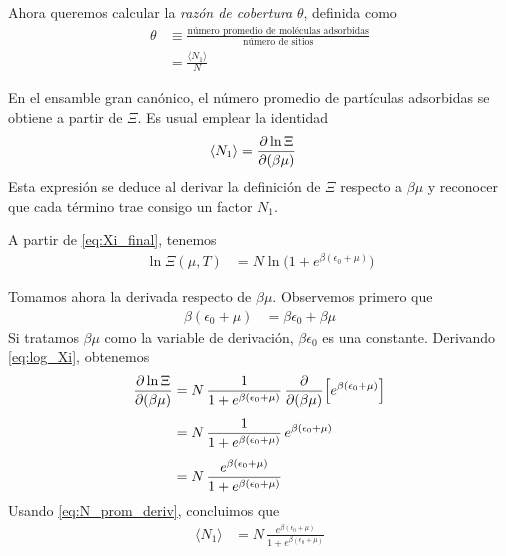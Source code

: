 \documentclass{article}
\begin{document}

Ahora queremos calcular la \emph{razón de cobertura} \(\theta\), definida como
\begin{equation}
\begin{split}
\theta
&\equiv \frac{\text{número promedio de moléculas adsorbidas}}{\text{número de sitios}} \\[4pt]
&= \frac{\langle N_{1} \rangle}{N}
\end{split}\label{eq:def_theta}
\end{equation}

En el ensamble gran canónico, el número promedio de partículas adsorbidas se obtiene a partir de \(\Xi\). Es usual emplear la identidad
\begin{equation}
\begin{split}
\langle N_{1} \rangle
&= \pdv{\ln \Xi}{(\beta\mu)}
\end{split}\label{eq:N_prom_deriv}
\end{equation}
Esta expresión se deduce al derivar la definición de \(\Xi\) respecto a \(\beta\mu\) y reconocer que cada término trae consigo un factor \(N_{1}\).

A partir de \eqref{eq:Xi_final}, tenemos
\begin{equation}
\begin{split}
\ln \Xi(\mu,T)
&= N \ln\big(1 + e^{\beta(\epsilon_{0}+\mu)}\big)
\end{split}\label{eq:log_Xi}
\end{equation}

Tomamos ahora la derivada respecto de \(\beta\mu\). Observemos primero que
\begin{equation}
\begin{split}
\beta(\epsilon_{0}+\mu)
&= \beta\epsilon_{0} + \beta\mu
\end{split}\label{eq:beta_argumento}
\end{equation}
Si tratamos \(\beta\mu\) como la variable de derivación, \(\beta\epsilon_{0}\) es una constante. Derivando \eqref{eq:log_Xi}, obtenemos
\begin{equation}
\begin{split}
\pdv{\ln \Xi}{(\beta\mu)}
&= N\,
\frac{1}{1 + e^{\beta(\epsilon_{0}+\mu)}}\,
\pdv{}{(\beta\mu)}\Big[e^{\beta(\epsilon_{0}+\mu)}\Big] \\[4pt]
&= N\,
\frac{1}{1 + e^{\beta(\epsilon_{0}+\mu)}}\,
e^{\beta(\epsilon_{0}+\mu)} \\[4pt]
&= N\,
\frac{e^{\beta(\epsilon_{0}+\mu)}}{1 + e^{\beta(\epsilon_{0}+\mu)}}
\end{split}\label{eq:deriv_logXi}
\end{equation}
Usando \eqref{eq:N_prom_deriv}, concluimos que
\begin{equation}
\begin{split}
\langle N_{1} \rangle
&= N\,
\frac{e^{\beta(\epsilon_{0}+\mu)}}{1 + e^{\beta(\epsilon_{0}+\mu)}}
\end{split}\label{eq:N_promedio_final}
\end{equation}
\end{document}
